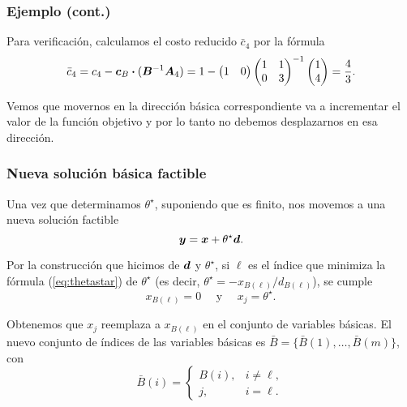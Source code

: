 \documentclass[aspectratio=169,12pt,spanish]{beamer}
\begin{document}

\begin{frame}
\frametitle{Ejemplo (cont.)}

Para verificación, calculamos el costo reducido $\bar c_4$ por la fórmula
$$
\bar c_4 = c_4 - \bm{c}_B \boldsymbol{\cdot} (\bm{B}^{-1} \bm{A}_4) = 1 - \begin{pmatrix} 1 & 0 \end{pmatrix} \begin{pmatrix} 1 & 1 \\ 0 & 3 \end{pmatrix}^{-1}
\begin{pmatrix} 1 \\ 4 \end{pmatrix} = \frac{4}{3}.
$$

Vemos que movernos en la dirección básica correspondiente va a incrementar el valor de la función objetivo y por lo tanto no debemos desplazarnos en esa dirección.

\end{frame}


\begin{frame}
\frametitle{Nueva solución básica factible}

Una vez que determinamos $\theta^\star$, suponiendo que es finito, nos movemos a una nueva solución factible
$$
\bm{y} = \bm{x} + \theta^\star \bm{d}.
$$

Por la construcción que hicimos de $\bm{d}$ y $\theta^\star$, si $\ell$ es el índice que minimiza la fórmula (\ref{eq:thetastar}) de $\theta^\star$ (es decir, $\theta^\star = -x_{B(\ell)} / d_{B(\ell)}$), se cumple
$$
x_{B(\ell)} = 0 \quad \text{ y } \quad x_j = \theta^\star.
$$

Obtenemos que $x_j$ reemplaza a $x_{B(\ell)}$ en el conjunto de variables básicas. El nuevo conjunto de índices de las variables básicas es $\bar B = \{\bar B(1), \dots, \bar B(m)\}$, con
$$
\bar B(i) = \begin{cases}
B(i), & i \neq \ell,\\
j, &i = \ell.
\end{cases}
$$

\end{frame}

\end{document}
